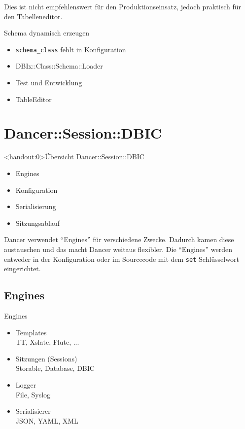 Dies ist nicht empfehlenswert für den Produktionseinsatz, jedoch
praktisch für den Tabelleneditor.

\begin{frame}[fragile]{Schema dynamisch erzeugen}
\begin{itemize}
\item \verb|schema_class| fehlt in Konfiguration
\item DBIx::Class::Schema::Loader
\item Test und Entwicklung
\item TableEditor
\end{itemize}
\end{frame}

\section{Dancer::Session::DBIC}

\begin{frame}<handout:0>{Übersicht Dancer::Session::DBIC}
\begin{itemize}
\item Engines
\item Konfiguration
\item Serialisierung
\item Sitzungsablauf
\end{itemize}
\end{frame}

Dancer verwendet ``Engines'' für verschiedene Zwecke.
Dadurch kamen diese austauschen und das macht Dancer
weitaus flexibler. Die ``Engines'' werden entweder 
in der Konfiguration oder im Sourcecode mit dem \verb|set|
Schlüsselwort eingerichtet.

\subsection{Engines}
\begin{frame}{Engines}
\begin{itemize}
\item Templates \\
TT, Xslate, Flute, ...
\item Sitzungen (Sessions) \\ 
Storable, Database, DBIC
\item Logger \\
File, Syslog
\item Serialisierer  \\
JSON, YAML, XML
\end{itemize}
\end{frame}


